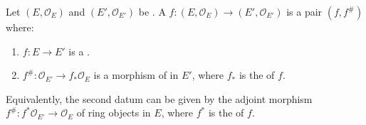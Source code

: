 \begin{definition} \label{definition:morphism_of_ringed_topoi}
    Let $(E, \mathcal{O}_E)$ and $(E', \mathcal{O}_{E'})$ be .
    A  $f: (E, \mathcal{O}_E) \to (E', \mathcal{O}_{E'})$ is a pair $(f, f^\#)$ where:
    \begin{enumerate}
        \item $f: E \to E'$ is a .
        \item $f^\#: \mathcal{O}_{E'} \to f_* \mathcal{O}_E$ is a morphism of  in $E'$, where $f_*$ is the  of $f$.
    \end{enumerate}
    Equivalently, the second datum can be given by the adjoint morphism $f^\#: f^* \mathcal{O}_{E'} \to \mathcal{O}_E$ of ring objects in $E$, where $f^*$ is the  of $f$.
\end{definition}